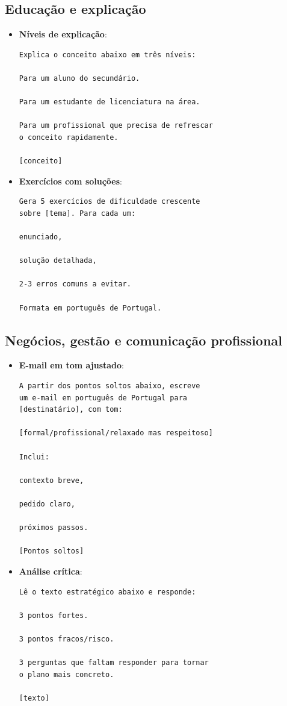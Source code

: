 \subsection*{Educação e explicação}

\begin{itemize}[leftmargin=*]
\item \textbf{Níveis de explicação}:
\begin{lstlisting}
Explica o conceito abaixo em três níveis:

Para um aluno do secundário.

Para um estudante de licenciatura na área.

Para um profissional que precisa de refrescar
o conceito rapidamente.

[conceito]
\end{lstlisting}
\item \textbf{Exercícios com soluções}:
\begin{lstlisting}
Gera 5 exercícios de dificuldade crescente
sobre [tema]. Para cada um:

enunciado,

solução detalhada,

2-3 erros comuns a evitar.

Formata em português de Portugal.
\end{lstlisting}
\end{itemize}

\subsection*{Negócios, gestão e comunicação profissional}

\begin{itemize}[leftmargin=*]
\item \textbf{E-mail em tom ajustado}:
\begin{lstlisting}
A partir dos pontos soltos abaixo, escreve
um e-mail em português de Portugal para
[destinatário], com tom:

[formal/profissional/relaxado mas respeitoso]

Inclui:

contexto breve,

pedido claro,

próximos passos.

[Pontos soltos]
\end{lstlisting}
\item \textbf{Análise crítica}:
\begin{lstlisting}
Lê o texto estratégico abaixo e responde:

3 pontos fortes.

3 pontos fracos/risco.

3 perguntas que faltam responder para tornar
o plano mais concreto.

[texto]
\end{lstlisting}
\end{itemize}

